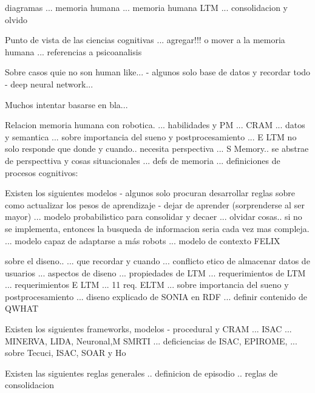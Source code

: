diagramas
... memoria humana \cite{Vijayakumar2014}
... memoria humana LTM \cite{Stachowicz2012}
... consolidacion y olvido \cite{Deutsch2008}

Punto de vista de las ciencias cognitivas
... agregar!!! o mover a la memoria humana
... referencias a psicoanalisis \cite{Deutsch2008}

Sobre casos quie no son human like...
- algunos solo base de datos y recordar todo
- deep neural network... \cite{KimMinJoo2016}


Muchos intentar basarse en bla...


Relacion memoria humana con robotica.
... habilidades y PM \cite{Salgado2012} ... CRAM
... datos y semantica
... sobre importancia del sueno y postprocesamiento \cite{Kelley2014}
 ... E LTM no solo responde que donde y cuando.. necesita perspectiva \cite{Stachowicz2012}
... S Memory.. se abstrae de perspecttiva y cosas situacionales \cite{Stachowicz2012}
... defs de memoria \cite{Deutsch2008}
... definiciones de procesos cognitivos: \cite{Deutsch2008}
 
 
Existen los siguientes modelos
- algunos solo procuran desarrollar reglas sobre como actualizar los pesos de aprendizaje
- dejar de aprender (sorprenderse al ser mayor)
... modelo probabilistico para consolidar y decaer \cite{Dodd2005}
... olvidar cosas.. si no se implementa, entonces la busqueda de informacion seria cada vez mas compleja. \cite{Deutsch2008}
... modelo capaz de adaptarse a m\'as robots \cite{Ho2009}
... modelo de contexto \cite{Sanchez:2015} FELIX

sobre el diseno..
... que recordar y cuando \cite{Kasap2010}
... conflicto etico de almacenar datos de usuarios \cite{Ho2009}
... aspectos de diseno \cite{Ho2009}
... propiedades de LTM \cite{Jockel2008}
... requerimientos de LTM \cite{Vijayakumar2014}
... requerimientos E LTM \cite{Stachowicz2012}
... 11 req. ELTM \cite{Stachowicz2012}
... sobre importancia del sueno y postprocesamiento \cite{Kelley2014}
... diseno explicado de SONIA en RDF \cite{Vijayakumar2014}
... definir contenido de QWHAT \cite{Stachowicz2012}

Existen los siguientes frameworks, modelos
- procedural y CRAM \cite{Winkler2014}
... ISAC \cite{Dodd2005}
... MINERVA, LIDA, Neuronal,M SMRTI \cite{Jockel2008}
... deficiencias de ISAC, EPIROME, \cite{Stachowicz2012}
... sobre Tecuci, ISAC, SOAR y Ho \cite{Deutsch2008}

Existen las siguientes reglas generales
.. definicion de episodio \cite{Dodd2005}
.. reglas de consolidacion \cite{Dodd2005}



